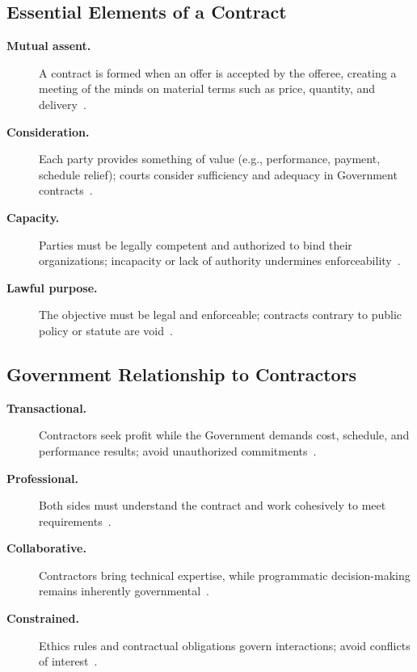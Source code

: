 \documentclass[../main.tex]{subfiles}
\begin{document}
\subsection{Essential Elements of a Contract}
\begin{description}
  \item[\textbf{Mutual assent.}] A contract is formed when an offer is accepted by the offeree, creating a meeting of the minds on material terms such as price, quantity, and delivery~\autocite{edo-3-2-1-intro-contracting-2025}.
  \item[\textbf{Consideration.}] Each party provides something of value (e.g., performance, payment, schedule relief); courts consider sufficiency and adequacy in Government contracts~\autocite{edo-3-2-1-intro-contracting-2025}.
  \item[\textbf{Capacity.}] Parties must be legally competent and authorized to bind their organizations; incapacity or lack of authority undermines enforceability~\autocite{edo-3-2-1-intro-contracting-2025}.
  \item[\textbf{Lawful purpose.}] The objective must be legal and enforceable; contracts contrary to public policy or statute are void~\autocite{edo-3-2-1-intro-contracting-2025}.
\end{description}

\subsection{Government Relationship to Contractors}
\begin{description}
  \item[\textbf{Transactional.}] Contractors seek profit while the Government demands cost, schedule, and performance results; avoid unauthorized commitments~\autocite{edo-3-2-1-intro-contracting-2025}.
  \item[\textbf{Professional.}] Both sides must understand the contract and work cohesively to meet requirements~\autocite{edo-3-2-1-intro-contracting-2025}.
  \item[\textbf{Collaborative.}] Contractors bring technical expertise, while programmatic decision-making remains inherently governmental~\autocite{edo-3-2-1-intro-contracting-2025}.
  \item[\textbf{Constrained.}] Ethics rules and contractual obligations govern interactions; avoid conflicts of interest~\autocite{edo-3-2-1-intro-contracting-2025}.
\end{description}
\end{document}
